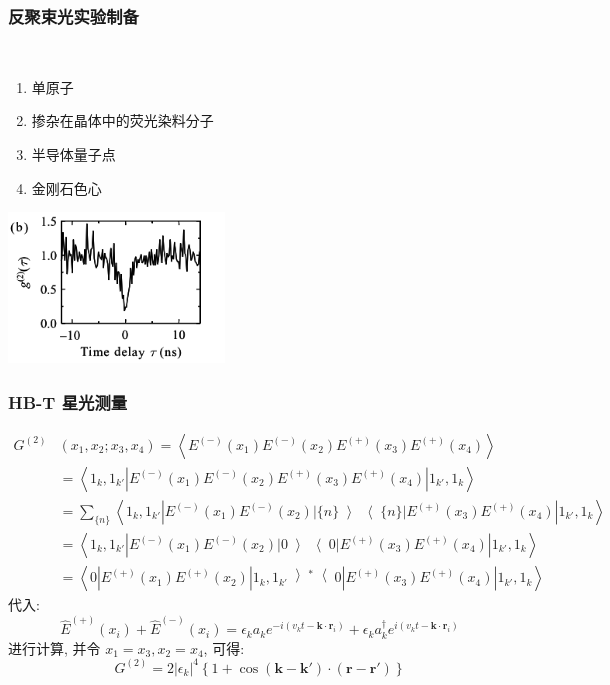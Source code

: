 \begin{frame} 
    \frametitle{反聚束光实验制备}
    ~ \\
    \begin{enumerate}
        \item 单原子
        \item 掺杂在晶体中的荧光染料分子
        \item 半导体量子点
        \item 金刚石色心
    \end{enumerate}
          \begin{center}
               \includegraphics[width=0.43\textwidth]{figs/2022-05-09-12-08-59.png}
          \end{center}
\end{frame}

\begin{frame} 
\frametitle{HB-T 星光测量}
     \[ \begin{aligned}
        G^{(2)}&(x_1, x_2; x_3,x_4) = \left\langle E^{(-)}(x_1)E^{(-)}(x_2)E^{(+)}(x_3)E^{(+)}(x_4) \right\rangle \\
        &= \left\langle 1_k, 1_{k'} \left| E^{(-)}(x_1)E^{(-)}(x_2)E^{(+)}(x_3)E^{(+)}(x_4) \right| 1_{k'}, 1_k \right\rangle \\
        &= \sum_{\{ n\}} \left\langle 1_k, 1_{k'} \left| E^{(-)}(x_1)E^{(-)}(x_2)  \left| \{ n\} \left\rangle  \right\langle \{ n\} \right| E^{(+)}(x_3)E^{(+)}(x_4) \right| 1_{k'}, 1_k \right\rangle \\
        &= \left\langle 1_k, 1_{k'} \left| E^{(-)}(x_1)E^{(-)}(x_2)  \left| 0 \left\rangle  \right\langle 0 \right| E^{(+)}(x_3)E^{(+)}(x_4) \right| 1_{k'}, 1_k \right\rangle \\ 
        &= \left\langle 0 \left| E^{(+)}(x_1)E^{(+)}(x_2)  \left| 1_k, 1_{k'}  \left\rangle^*  \right\langle 0 \right| E^{(+)}(x_3)E^{(+)}(x_4) \right| 1_{k'}, 1_k \right\rangle
     \end{aligned}\] 
    代入:
    \[\hat{E}^{(+)} (x_i) + \hat{E}^{(-)}(x_i) =\epsilon_k a_k e^{-i(v_k t - \mathbf{k}\cdot \mathbf{r}_i)} + \epsilon_k a^{\dagger} _k e^{i(v_k t - \mathbf{k}\cdot \mathbf{r}_i)}\]
    进行计算, 并令 $x_{1}=x_3, x_2=x_4$, 可得: 
    \[ G^{(2)} = 2 \left|\epsilon_k\right|^4 \left\{ 1+ \cos (\mathbf{k} - \mathbf{k}')\cdot (\mathbf{r}- \mathbf{r}')  \right\}\]
\end{frame}


